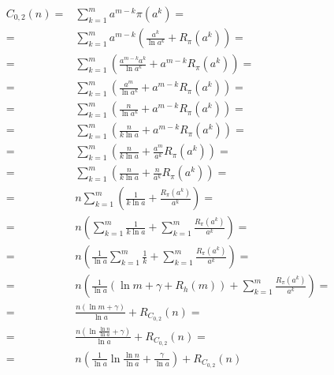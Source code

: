 \documentclass{article}
\begin{document}
\begin{align*}
C_{0,2}(n) =& \sum_{k=1}^{m} a^{m-k} \pi(a^k) = \\
=& \sum_{k=1}^{m} a^{m-k} \left( \frac{a^k}{\ln{a^k}} + R_{\pi}(a^k) \right) = \\
=& \sum_{k=1}^{m} \left( \frac{a^{m-k} a^k}{\ln{a^k}} + a^{m-k} R_{\pi}(a^k) \right) = \\
=& \sum_{k=1}^{m} \left( \frac{a^m}{\ln{a^k}} + a^{m-k} R_{\pi}(a^k) \right) = \\
=& \sum_{k=1}^{m} \left( \frac{n}{\ln{a^k}} + a^{m-k} R_{\pi}(a^k) \right) = \\
=& \sum_{k=1}^{m} \left( \frac{n}{k \ln{a}} + a^{m-k} R_{\pi}(a^k) \right) = \\
=& \sum_{k=1}^{m} \left( \frac{n}{k \ln{a}} + \frac{a^m}{a^k} R_{\pi}(a^k) \right) = \\
=& \sum_{k=1}^{m} \left( \frac{n}{k \ln{a}} + \frac{n}{a^k} R_{\pi}(a^k) \right) = \\
=& n \sum_{k=1}^{m} \left( \frac{1}{k \ln{a}} + \frac{R_{\pi}(a^k)}{a^k} \right) = \\
=& n \left( \sum_{k=1}^{m} \frac{1}{k \ln{a}} + \sum_{k=1}^{m} \frac{R_{\pi}(a^k)}{a^k} \right) = \\
=& n \left( \frac{1}{\ln{a}} \sum_{k=1}^{m} \frac{1}{k} + \sum_{k=1}^{m} \frac{R_{\pi}(a^k)}{a^k} \right) = \\
=& n \left( \frac{1}{\ln{a}} \left(  \ln{m} + \gamma + R_h(m) \right) + \sum_{k=1}^{m} \frac{R_{\pi}(a^k)}{a^k} \right) = \\
=& \frac{n( \ln{m} + \gamma )}{\ln{a}} + R_{C_{0,2}}(n) = \\
=& \frac{n( \ln{\frac{\ln{n}}{\ln{a}}} + \gamma )}{\ln{a}} + R_{C_{0,2}}(n) = \\
=& n \left( \frac{1}{\ln{a}}\ln{\frac{\ln{n}}{\ln{a}}} +  \frac{\gamma}{\ln{a}} \right) + R_{C_{0,2}}(n)
\end{align*}
\end{document}
